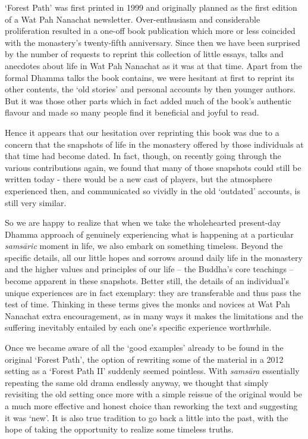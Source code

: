 
`Forest Path' was first printed in 1999 and originally planned as the
first edition of a Wat Pah Nanachat newsletter. Over-enthusiasm and
considerable proliferation resulted in a one-off book publication which
more or less coincided with the monastery's twenty-fifth anniversary.
Since then we have been surprised by the number of requests to reprint
this collection of little essays, talks and anecdotes about life in Wat
Pah Nanachat as it was at that time. Apart from the formal Dhamma talks
the book contains, we were hesitant at first to reprint its other
contents, the `old stories' and personal accounts by then younger
authors. But it was those other parts which in fact added much of the
book's authentic flavour and made so many people find it beneficial and
joyful to read.

Hence it appears that our hesitation over reprinting this book was due
to a concern that the snapshots of life in the monastery offered by
those individuals at that time had become dated. In fact, though, on
recently going through the various contributions again, we found that
many of those snapshots could still be written today - there would be a
new cast of players, but the atmosphere experienced then, and
communicated so vividly in the old `outdated' accounts, is still very
similar.

So we are happy to realize that when we take the wholehearted
present-day Dhamma approach of genuinely experiencing what is happening
at a particular \emph{samsāric} moment in life, we also embark on
something timeless. Beyond the specific details, all our little hopes
and sorrows around daily life in the monastery and the higher values and
principles of our life -- the Buddha's core teachings -- become apparent
in these snapshots. Better still, the details of an individual's unique
experiences are in fact exemplary: they are transferable and thus pass
the test of time. Thinking in these terms gives the monks and novices at
Wat Pah Nanachat extra encouragement, as in many ways it makes the
limitations and the suffering inevitably entailed by each one's specific
experience worthwhile.

Once we became aware of all the `good examples' already to be found in
the original `Forest Path', the option of rewriting some of the material
in a 2012 setting as a `Forest Path II' suddenly seemed pointless. With
\emph{samsāra} essentially repeating the same old drama endlessly
anyway, we thought that simply revisiting the old setting once more with
a simple reissue of the original would be a much more effective and
honest choice than reworking the text and suggesting it was `new'. It is
also true tradition to go back a little into the past, with the hope of
taking the opportunity to realize some timeless truths.

